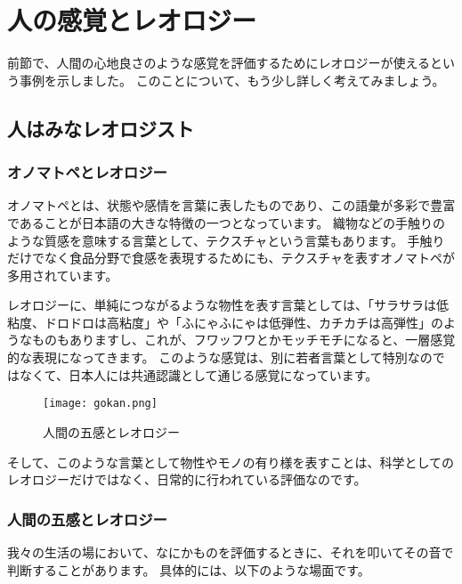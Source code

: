 \documentclass[uplatex,dvipdfmx,a4paper,11pt]{jsreport}
\begin{document}
\section{人の感覚とレオロジー}
\label{sec:1_kankaku}

前節で、人間の心地良さのような感覚を評価するためにレオロジーが使えるという事例を示しました。
このことについて、もう少し詳しく考えてみましょう。

\subsection{人はみなレオロジスト}

\subsubsection{オノマトペとレオロジー}

オノマトペとは、状態や感情を言葉に表したものであり、この語彙が多彩で豊富であることが日本語の大きな特徴の一つとなっています。
織物などの手触りのような質感を意味する言葉として、テクスチャという言葉もあります。
手触りだけでなく食品分野で食感を表現するためにも、テクスチャを表すオノマトペが多用されています。

レオロジーに、単純につながるような物性を表す言葉としては、「サラサラは低粘度、ドロドロは高粘度」や「ふにゃふにゃは低弾性、カチカチは高弾性」のようなものもありますし、これが、フワッフワとかモッチモチになると、一層感覚的な表現になってきます。
このような感覚は、別に若者言葉として特別なのではなくて、日本人には共通認識として通じる感覚になっています。
\begin{figure}[htb]
	\begin{center}
		\texttt{[image: gokan.png]}
		\caption{人間の五感とレオロジー}
		\label{gokan}
	\end{center}
\end{figure}

そして、このような言葉として物性やモノの有り様を表すことは、科学としてのレオロジーだけではなく、日常的に行われている評価なのです。

\subsubsection{人間の五感とレオロジー}

我々の生活の場において、なにかものを評価するときに、それを叩いてその音で判断することがあります。
具体的には、以下のような場面です。
\end{document}
